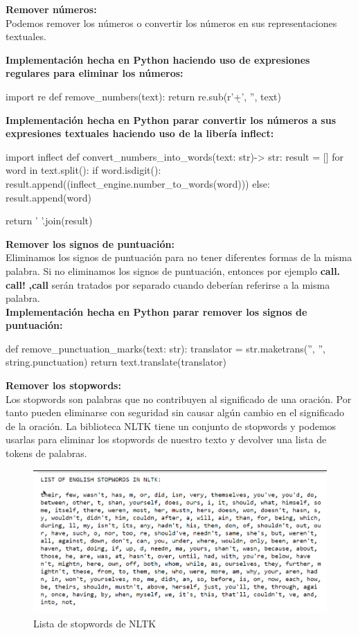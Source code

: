 \documentclass{llncs}
\begin{document}
\noindent
\textbf{Remover números:}\\
Podemos remover los números o convertir los números en sus representaciones textuales. 

\noindent
\textbf{Implementación hecha en Python haciendo uso de expresiones regulares para eliminar los números:}
\begin{python}
    import re
    def remove_numbers(text):
        return re.sub(r'\d+', '', text)
\end{python}

\noindent
\textbf{Implementación hecha en Python parar convertir los números a sus expresiones textuales haciendo uso de la libería inflect:}
\begin{python}
    import inflect
    def convert_numbers_into_words(text: str)-> str:
        result = []
        for word in text.split(): 
            if word.isdigit(): 
                result.append((inflect_engine.number_to_words(word)))
            else:
                result.append(word)

        return ' '.join(result)
\end{python}


\noindent
\textbf{Remover los signos de puntuación:}\\ 
\noindent
Eliminamos los signos de puntuación para no tener diferentes formas de la misma palabra. 
Si no eliminamos los signos de puntuación, entonces  por ejemplo \textbf{call.} \textbf{call!} 
\textbf{,call}  serán tratados por separado cuando deberían referirse a la misma palabra.
\\
\textbf{Implementación hecha en Python parar remover los signos de puntuación:}
\begin{python}
    def remove_punctuation_marks(text: str):
        translator = str.maketrans('', '', string.punctuation)
        return text.translate(translator)
\end{python}

\noindent
\textbf{Remover los stopwords:}\\ 
\noindent
Los stopwords son palabras que no contribuyen al significado de una oración. Por tanto
pueden eliminarse con seguridad sin causar algún cambio en el significado de la oración.
La biblioteca NLTK tiene un conjunto de stopwords y podemos usarlas para eliminar 
los stopwords de nuestro texto y devolver una lista de tokens de palabras. 

\begin{figure}
    \caption{Lista de stopwords de NLTK}
    \includegraphics[scale = .3]{./images/englis_stopwords_nltk.png}
\end{figure}
\end{document}
